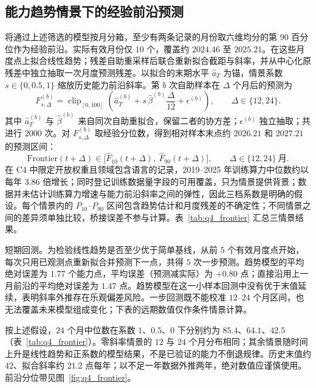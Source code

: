 \subsection{能力趋势情景下的经验前沿预测}
将通过上述筛选的模型按月分箱，至少有两条记录的月份取六维均分的第 $90$ 百分位作为经验前沿。实际有效月份仅 $10$ 个，覆盖约 $2024.46$ 至 $2025.21$。在这些月度点上拟合线性趋势；残差自助重采样后联合重新拟合截距与斜率，并从中心化原残差中独立抽取一次月度预测残差。以拟合的末期水平 $\hat a_T$ 为锚，情景系数 $s\in\{0,0.5,1\}$ 缩放历史能力前沿斜率。第 $b$ 次自助样本在 $\Delta$ 个月后的预测为
\begin{equation}
F^{(b)}_{s,\Delta}=\operatorname{clip}_{[0,100]}
\left(\hat a_T^{(b)}+s\,\hat\beta^{(b)}\frac{\Delta}{12}+\epsilon^{(b)}\right),
\qquad \Delta\in\{12,24\}.
\label{eq:q4-bootstrap}
\end{equation}
其中 $\hat a_T^{(b)}$ 与 $\hat\beta^{(b)}$ 来自同次自助重拟合，保留二者的协方差；$\epsilon^{(b)}$ 独立抽取；共进行 $2000$ 次。对 $F^{(b)}_{s,\Delta}$ 取经验分位数，得到相对样本末点约 $2026.21$ 和 $2027.21$ 的预测区间：
\begin{equation}
\mathrm{Frontier}(t+\Delta)\in\bigl[\hat F_{10}(t+\Delta),\ \hat F_{90}(t+\Delta)\bigr],\qquad \Delta\in\{12,24\}\ \text{月}.
\label{eq:q4-frontier}
\end{equation}
在 C4 中限定开放权重且领域包含语言的记录，2019--2025 年训练算力中位数约以每年 $3.86$ 倍增长；同时登记训练数据量字段的可用覆盖，只为情景提供背景；数据并未估计训练算力增速与能力前沿斜率之间的弹性，因此三档系数是明确的假设。每个情景内的 $P_{10}$--$P_{90}$ 区间包含趋势估计和月度残差的不确定性；不同情景之间的差异须单独比较，桥接误差不参与计算。表~\ref{tab:q4_frontier} 汇总三情景结果。

短期回测。为检验线性趋势是否至少优于简单基线，从前 $5$ 个有效月度点开始，每次只用已观测点重新拟合并预测下一点，共得 $5$ 次一步预测。趋势模型的平均绝对误差为 $1.77$ 个能力点，平均误差（预测减实际）为 $+0.80$ 点；直接沿用上一月前沿的平均绝对误差为 $1.47$ 点。趋势模型在这一小样本回测中没有优于末值延续，表明斜率外推存在乐观偏差风险。一步回测既不能校准 $12$--$24$ 个月区间，也无法覆盖未来模型组成变化；下表的远期数值仅作条件情景计算。



按上述假设，$24$ 个月中位数在系数 $1$、$0.5$、$0$ 下分别约为 $85.4$、$64.1$、$42.5$（表~\ref{tab:q4_frontier}）。零斜率情景的 $12$ 与 $24$ 个月分布相同；其余情景随时间上升是线性趋势和正系数的模型结果，不是已验证的能力不倒退规律。历史末值约 $42$、拟合斜率约 $21.2$ 点每年；以不足一年数据外推两年，绝对数值应谨慎使用。前沿分位带见图~\ref{fig:q4_frontier}。


